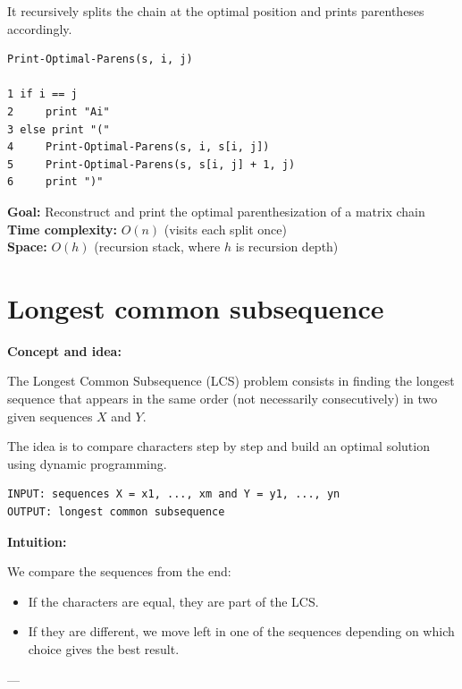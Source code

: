\documentclass[11pt,a4paper,openany]{book}
\begin{document}
It recursively splits the chain at the optimal position and prints parentheses accordingly.

\begin{lstlisting}
Print-Optimal-Parens(s, i, j)

1 if i == j
2     print "Ai"
3 else print "("
4     Print-Optimal-Parens(s, i, s[i, j])
5     Print-Optimal-Parens(s, s[i, j] + 1, j)
6     print ")"
\end{lstlisting}

\textbf{Goal:} Reconstruct and print the optimal parenthesization of a matrix chain \\

\textbf{Time complexity:} $O(n)$ (visits each split once) \\

\textbf{Space:} $O(h)$ (recursion stack, where $h$ is recursion depth)



\vspace{2cm}




\section{Longest common subsequence}



\textbf{Concept and idea:}

The Longest Common Subsequence (LCS) problem consists in finding the longest sequence that appears in the same order (not necessarily consecutively) in two given sequences $X$ and $Y$.

The idea is to compare characters step by step and build an optimal solution using dynamic programming.

\begin{lstlisting}
INPUT: sequences X = x1, ..., xm and Y = y1, ..., yn
OUTPUT: longest common subsequence
\end{lstlisting}

\textbf{Intuition:}

We compare the sequences from the end:
\begin{itemize}
    \item If the characters are equal, they are part of the LCS.
    \item If they are different, we move left in one of the sequences depending on which choice gives the best result.
\end{itemize}

---
\end{document}
